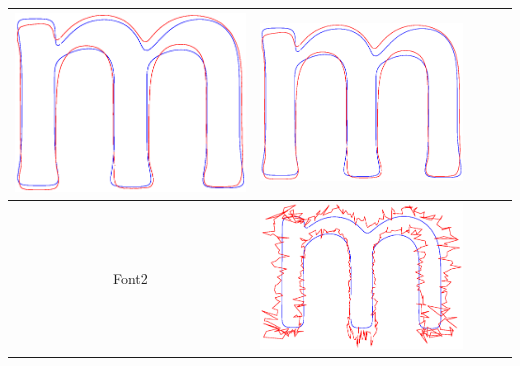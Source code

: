 \documentclass[12pt]{article}
\begin{document}
\begin{center}
\begin{tabular}{|c|c|c|c|c|}
\includegraphics[scale = 0.2]{images/f1var0_1} &
\includegraphics[scale = 0.2]{images/f1var0_01} \\ \hline
Font2 & 
\includegraphics[scale = 0.2]{images/f2var10} &

\end{tabular}
\end{center}
\end{document}
